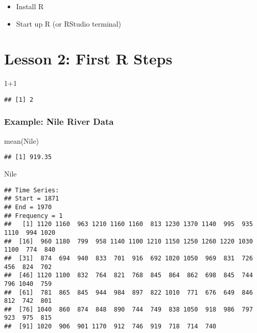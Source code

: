 \documentclass[
]{article}
\newenvironment{Shaded}{\begin{snugshade}}{\end{snugshade}}
\newcommand{\DecValTok}[1]{\textcolor[rgb]{0.00,0.00,0.81}{#1}}
\newcommand{\FunctionTok}[1]{\textcolor[rgb]{0.00,0.00,0.00}{#1}}
\newcommand{\NormalTok}[1]{#1}
\newcommand{\SpecialCharTok}[1]{\textcolor[rgb]{0.00,0.00,0.00}{#1}}
\providecommand{\tightlist}{%
  \setlength{\itemsep}{0pt}\setlength{\parskip}{0pt}}
\begin{document}
\begin{itemize}
\tightlist
\item
  Install R
\item
  Start up R (or RStudio terminal)
\end{itemize}

\hypertarget{lesson-2-first-r-steps}{%
\section{Lesson 2: First R Steps}\label{lesson-2-first-r-steps}}

\begin{Shaded}
\begin{Highlighting}[]
\DecValTok{1}\SpecialCharTok{+}\DecValTok{1}
\end{Highlighting}
\end{Shaded}

\begin{verbatim}
## [1] 2
\end{verbatim}

\hypertarget{example-nile-river-data}{%
\subsubsection{Example: Nile River Data}\label{example-nile-river-data}}

\begin{Shaded}
\begin{Highlighting}[]
\FunctionTok{mean}\NormalTok{(Nile)}
\end{Highlighting}
\end{Shaded}

\begin{verbatim}
## [1] 919.35
\end{verbatim}

\begin{Shaded}
\begin{Highlighting}[]
\NormalTok{Nile}
\end{Highlighting}
\end{Shaded}

\begin{verbatim}
## Time Series:
## Start = 1871 
## End = 1970 
## Frequency = 1 
##   [1] 1120 1160  963 1210 1160 1160  813 1230 1370 1140  995  935 1110  994 1020
##  [16]  960 1180  799  958 1140 1100 1210 1150 1250 1260 1220 1030 1100  774  840
##  [31]  874  694  940  833  701  916  692 1020 1050  969  831  726  456  824  702
##  [46] 1120 1100  832  764  821  768  845  864  862  698  845  744  796 1040  759
##  [61]  781  865  845  944  984  897  822 1010  771  676  649  846  812  742  801
##  [76] 1040  860  874  848  890  744  749  838 1050  918  986  797  923  975  815
##  [91] 1020  906  901 1170  912  746  919  718  714  740
\end{verbatim}
\end{document}
